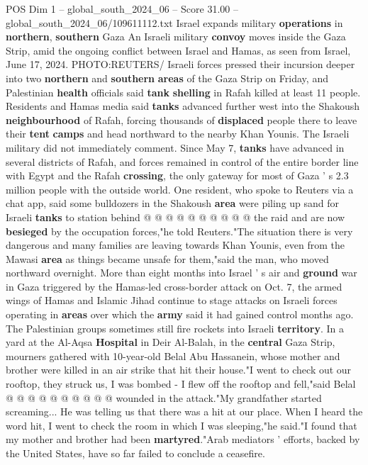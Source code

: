\begin{textsample}{POS Dim 1 – global\_south\_2024\_06 – Score 31.00 – global\_south\_2024\_06/109611112.txt}  \label{ex:f1_pos_048}
Israel expands military \textbf{operations} in \textbf{northern}, \textbf{southern} Gaza An Israeli military \textbf{convoy} moves inside the Gaza Strip, amid the ongoing conflict between Israel and Hamas, as seen from Israel, June 17, 2024.
PHOTO:REUTERS/ Israeli forces pressed their incursion deeper into two \textbf{northern} and \textbf{southern} \textbf{areas} of the Gaza Strip on Friday, and Palestinian \textbf{health} officials said \textbf{tank} \textbf{shelling} in Rafah killed at least 11 people.
Residents and Hamas media said \textbf{tanks} advanced further west into the Shakoush \textbf{neighbourhood} of Rafah, forcing thousands of \textbf{displaced} people there to leave their \textbf{tent} \textbf{camps} and head northward to the nearby Khan Younis.
The Israeli military did not immediately comment.
Since May 7, \textbf{tanks} have advanced in several districts of Rafah, and forces remained in control of the entire border line with Egypt and the Rafah \textbf{crossing}, the only gateway for most of Gaza ' s 2.3 million people with the outside world.
One resident, who spoke to Reuters via a chat app, said some bulldozers in the Shakoush \textbf{area} were piling up sand for Israeli \textbf{tanks} to station behind @ @ @ @ @ @ @ @ @ @ the raid and are now \textbf{besieged} by the occupation forces,"he told Reuters."The situation there is very dangerous and many families are leaving towards Khan Younis, even from the Mawasi \textbf{area} as things became unsafe for them,"said the man, who moved northward overnight.
More than eight months into Israel ' s air and \textbf{ground} war in Gaza triggered by the Hamas-led cross-border attack on Oct. 7, the armed wings of Hamas and Islamic Jihad continue to stage attacks on Israeli forces operating in \textbf{areas} over which the \textbf{army} said it had gained control months ago.
The Palestinian groups sometimes still fire rockets into Israeli \textbf{territory}.
In a yard at the Al-Aqsa \textbf{Hospital} in Deir Al-Balah, in the \textbf{central} Gaza Strip, mourners gathered with 10-year-old Belal Abu Hassanein, whose mother and brother were killed in an air strike that hit their house."I went to check out our rooftop, they struck us, I was bombed - I flew off the rooftop and fell,"said Belal @ @ @ @ @ @ @ @ @ @ wounded in the attack."My grandfather started screaming...
He was telling us that there was a hit at our place.
When I heard the word hit, I went to check the room in which I was sleeping,"he said."I found that my mother and brother had been \textbf{martyred}."Arab mediators ' efforts, backed by the United States, have so far failed to conclude a ceasefire.

\end{textsample}
